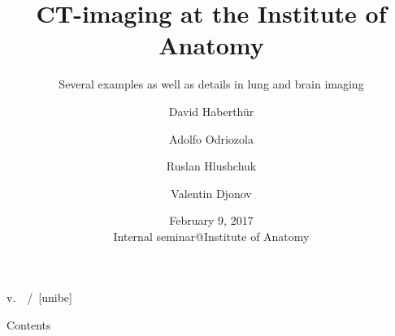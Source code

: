 \documentclass[caption=numbered]{beamer}
\subtitle{Several examples as well as details in lung and brain imaging}
\author[David Haberthür]{David Haberthür \and\tiny Adolfo Odriozola \and Ruslan Hlushchuk \and Valentin Djonov}
\institute{Institute of Anatomy\\Universität Bern}
\date{February 9, 2017\\Internal seminar@Institute of Anatomy}
\begin{document}
\title[\si{\micro}CT in biological studies]{\si{\micro}CT-imaging at the Institute of Anatomy} %

{%
	\hspace*{\fill}%
	\insertshortauthor%
	\hspace*{\fill}%
	\insertshorttitle%
	\hspace*{\fill}%
	v.~\gitAbbrevHash%
	\hspace*{\fill}%
	\insertframenumber\,/\,\insertpresentationendpage%
	\hspace*{\fill}%
	\vskip2pt%
}
[unibe]

{
\begin{frame}
  \titlepage
\end{frame}
}
\addtocounter{framenumber}{1}

\begin{frame}{Contents}
	\tableofcontents
\end{frame}
\end{document}
